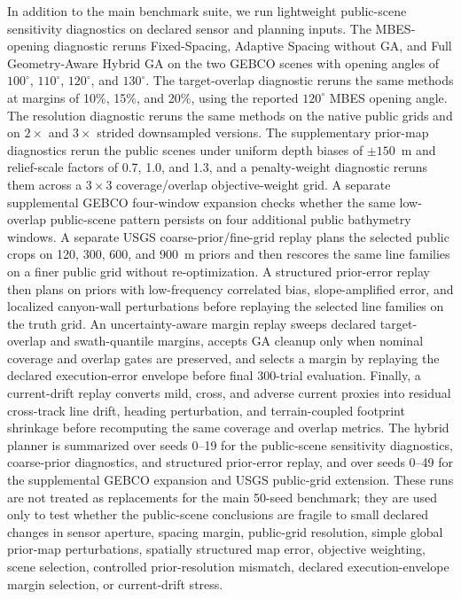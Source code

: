 \documentclass[jmse,article,submit,moreauthors]{Definitions/mdpi}
\begin{document}
In addition to the main benchmark suite, we run lightweight public-scene sensitivity diagnostics on declared sensor and planning inputs. The MBES-opening diagnostic reruns Fixed-Spacing, Adaptive Spacing without GA, and Full Geometry-Aware Hybrid GA on the two GEBCO scenes with opening angles of \(100^{\circ}\), \(110^{\circ}\), \(120^{\circ}\), and \(130^{\circ}\). The target-overlap diagnostic reruns the same methods at margins of 10\%, 15\%, and 20\%, using the reported \(120^{\circ}\) MBES opening angle. The resolution diagnostic reruns the same methods on the native public grids and on \(2\times\) and \(3\times\) strided downsampled versions. The supplementary prior-map diagnostics rerun the public scenes under uniform depth biases of \(\pm 150\)~m and relief-scale factors of 0.7, 1.0, and 1.3, and a penalty-weight diagnostic reruns them across a \(3\times3\) coverage/overlap objective-weight grid. A separate supplemental GEBCO four-window expansion checks whether the same low-overlap public-scene pattern persists on four additional public bathymetry windows. A separate USGS coarse-prior/fine-grid replay plans the selected public crops on 120, 300, 600, and 900~m priors and then rescores the same line families on a finer public grid without re-optimization. A structured prior-error replay then plans on priors with low-frequency correlated bias, slope-amplified error, and localized canyon-wall perturbations before replaying the selected line families on the truth grid. An uncertainty-aware margin replay sweeps declared target-overlap and swath-quantile margins, accepts GA cleanup only when nominal coverage and overlap gates are preserved, and selects a margin by replaying the declared execution-error envelope before final 300-trial evaluation. Finally, a current-drift replay converts mild, cross, and adverse current proxies into residual cross-track line drift, heading perturbation, and terrain-coupled footprint shrinkage before recomputing the same coverage and overlap metrics. The hybrid planner is summarized over seeds 0--19 for the public-scene sensitivity diagnostics, coarse-prior diagnostics, and structured prior-error replay, and over seeds 0--49 for the supplemental GEBCO expansion and USGS public-grid extension. These runs are not treated as replacements for the main 50-seed benchmark; they are used only to test whether the public-scene conclusions are fragile to small declared changes in sensor aperture, spacing margin, public-grid resolution, simple global prior-map perturbations, spatially structured map error, objective weighting, scene selection, controlled prior-resolution mismatch, declared execution-envelope margin selection, or current-drift stress.
\end{document}
